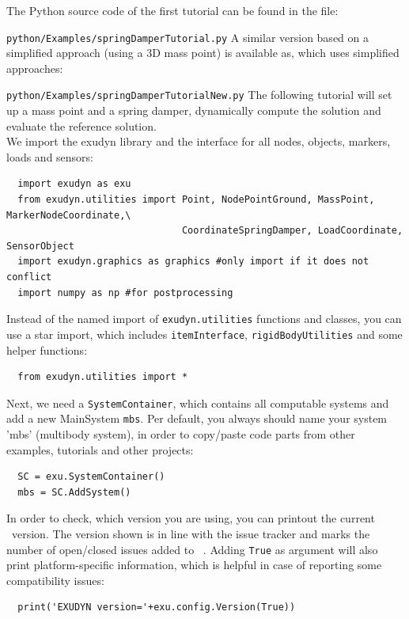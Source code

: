 The Python source code of the first tutorial can be found in the file:
\bi
  \item[] \texttt{python/Examples/springDamperTutorial.py}
\ei
A similar version based on a simplified approach (using a 3D mass point) is available as, which uses simplified approaches:
\bi
  \item[] \texttt{python/Examples/springDamperTutorialNew.py}
\ei
The following tutorial will set up a mass point and a spring damper, dynamically compute the solution and evaluate the reference solution.
\vspace{6pt}\\
We import the exudyn library and the interface for all nodes, objects, markers, loads and sensors:
\pythonstyle\begin{lstlisting}
  import exudyn as exu
  from exudyn.utilities import Point, NodePointGround, MassPoint, MarkerNodeCoordinate,\
                               CoordinateSpringDamper, LoadCoordinate, SensorObject
  import exudyn.graphics as graphics #only import if it does not conflict
  import numpy as np #for postprocessing
\end{lstlisting}
%
Instead of the named import of \texttt{exudyn.utilities} functions and classes, you can use a star import,
which includes \texttt{itemInterface}, \texttt{rigidBodyUtilities} and some helper functions:
\pythonstyle\begin{lstlisting}
  from exudyn.utilities import *
\end{lstlisting}
%
Next, we need a \texttt{SystemContainer}, which contains all computable systems and add a new MainSystem \texttt{mbs}.
Per default, you always should name your system 'mbs' (multibody system), in order to copy/paste code parts from other examples, tutorials and other projects:
\pythonstyle\begin{lstlisting}
  SC = exu.SystemContainer()
  mbs = SC.AddSystem()
\end{lstlisting}
%
In order to check, which version you are using, you can printout the current \codeName\ version. 
The version shown is in line with the issue tracker and marks the number of open/closed issues added to \codeName\ .
Adding \texttt{True} as argument will also print platform-specific information, which is helpful 
in case of reporting some compatibility issues:
\pythonstyle\begin{lstlisting}
  print('EXUDYN version='+exu.config.Version(True))
\end{lstlisting}
